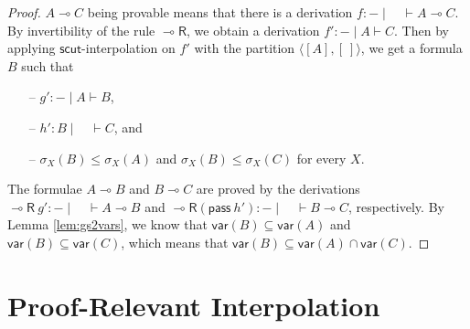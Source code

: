 \documentclass[sn-mathphys-num]{sn-jnl}%
\newcommand{\vd}{\vdash}
\newcommand{\pass}{\mathsf{pass}}
\newcommand{\lolli}{\multimap}
\newcommand{\lright}{{\lolli}\mathsf{R}}
\newcommand{\mf}[1]{\mathsf{#1}}
\newcommand{\gs}[1]{\sigma_{X} (#1)}
\newcommand{\vars}[1]{\mf{var} (#1)}
\theoremstyle{thmstyleone}%
\theoremstyle{thmstyletwo}%
\theoremstyle{thmstylethree}%
\begin{document}
\begin{proof}
$A \lolli C$ being provable means that there is a derivation $f : {-} \mid \quad \vd A \lolli C$. 
By invertibility of the rule $\lright$, we obtain a derivation $f' : {-} \mid A \vd C$.
Then by applying $\mf{scut}$-interpolation on $f'$ with the partition $\langle [A ], [\ ]\rangle$, we get a formula $B$ such that 
\begin{itemize}
  \item[--] $g': {-} \mid A \vd B$,
  \item[--] $h': B \mid \quad \vd C$, and 
  \item[--] $\gs{B} \leq \gs{A} $ and $ \gs{B} \leq \gs{C}$ for every $X$.
\end{itemize}
The formulae $A \lolli B$ and $B \lolli C$ are proved by the derivations $\lright \ g' : {-} \mid \quad \vd A \lolli B$ and $\lright (\pass \ h') : {-} \mid \quad \vd B \lolli C$, respectively.
By Lemma \ref{lem:gs2vars}, we know that $\vars{B} \subseteq \vars{A}$ and $\vars{B} \subseteq \vars{C}$, which means that $\vars{B} \subseteq \vars{A} \cap \vars{C}$.
\end{proof}

\section{Proof-Relevant Interpolation}\label{sec:proof-rel} 
\end{document}
